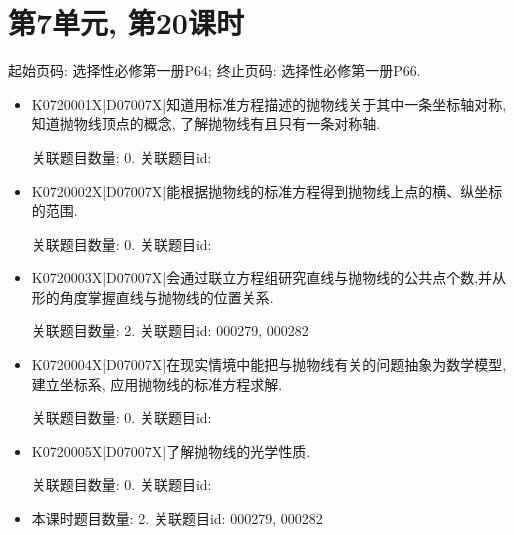 \section*{第7单元, 第20课时}
起始页码: 选择性必修第一册P64; 终止页码: 选择性必修第一册P66.
\begin{itemize}
\item K0720001X|D07007X|知道用标准方程描述的抛物线关于其中一条坐标轴对称, 知道抛物线顶点的概念, 了解抛物线有且只有一条对称轴.

关联题目数量: 0. 关联题目id: 

\item K0720002X|D07007X|能根据抛物线的标准方程得到抛物线上点的横、纵坐标的范围.

关联题目数量: 0. 关联题目id: 

\item K0720003X|D07007X|会通过联立方程组研究直线与抛物线的公共点个数,并从形的角度掌握直线与抛物线的位置关系.

关联题目数量: 2. 关联题目id: 000279, 000282

\item K0720004X|D07007X|在现实情境中能把与抛物线有关的问题抽象为数学模型, 建立坐标系, 应用抛物线的标准方程求解.

关联题目数量: 0. 关联题目id: 

\item K0720005X|D07007X|了解抛物线的光学性质.

关联题目数量: 0. 关联题目id: 

\item 本课时题目数量: 2. 关联题目id: 000279, 000282

\end{itemize}

